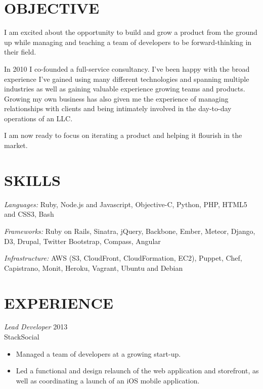 \documentclass[line,margin]{res}
\begin{document}
\address{q.shanahan@gmail.com}
\address{(641) 233-1123}

\begin{resume}

\section{OBJECTIVE}

    I am excited about the opportunity to build and grow a product from the
    ground up while managing and teaching a team of developers to be
    forward-thinking in their field.

    In 2010 I co-founded a full-service consultancy. I've been happy with the
    broad experience I've gained using many different technologies and
    spanning multiple industries as well as gaining valuable experience
    growing teams and products. Growing my own business has also given me the
    experience of managing relationships with clients and being intimately
    involved in the day-to-day operations of an LLC.

    I am now ready to focus on iterating a product and helping it flourish in
    the market.

\section{SKILLS}
    {\sl Languages:}
        Ruby, Node.js and Javascript,
        Objective-C, Python, PHP, HTML5 and CSS3, Bash

    {\sl Frameworks:}
        Ruby on Rails, Sinatra, jQuery, Backbone, Ember, Meteor,
        Django, D3, Drupal, Twitter Bootstrap, Compass, Angular

    {\sl Infrastructure:}
        AWS (S3, CloudFront, CloudFormation, EC2), Puppet,
        Chef, Capistrano, Monit, Heroku, Vagrant, Ubuntu and Debian

\section{EXPERIENCE}
    {\sl Lead Developer}
    \hfill 2013 \\
    StackSocial
    \begin{itemize} \itemsep -2pt
        \item
            Managed a team of developers at a growing start-up.

        \item
            Led a functional and design relaunch of the web
            application and storefront, as well as coordinating
            a launch of an iOS mobile application.


\end{itemize}
\end{resume}
\end{document}
